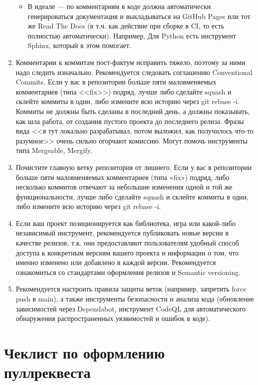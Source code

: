 \documentclass[a5paper]{article}
\begin{document}
\begin{enumerate}
\begin{itemize}
        \item В идеале --- по комментариям в коде должна автоматически генерироваться документация и выкладываться на GitHub Pages или тот же Read The Docs (в т.ч. как действие при сборке в CI, то есть полностью автоматически). Например, Для Python есть инструмент Sphinx, который в этом помогает.
    \end{itemize}
    \item Комментарии к коммитам пост-фактум исправить тяжело, поэтому за ними надо следить изначально. Рекомендуется следовать соглашению Conventional Commits. Если у вас в репозитории больше пяти маловменяемых комментариев (типа <<fix>>) подряд, лучше либо сделайте squash и склейте коммиты в один, либо измените всю историю через git rebase -i. Коммиты не должны быть сделаны в последний день, а должны показывать, как шла работа, от создания пустого проекта до последнего релиза. Фразы вида <<я тут локально разрабатывал, потом выложил, как получилось что-то разумное>> очень сильно огорчают комиссию. Могут помочь инструменты типа Mergeable, Mergify.
    \item Почистите главную ветку репозитория от лишнего. Если у вас в репозитории больше пяти маловменяемых комментариев (типа «fix») подряд, либо несколько коммитов отвечают за небольшие изменения одной и той же функциональности, лучше либо сделайте squash и склейте коммиты в один, либо измените всю историю через git rebase -i.
    \item Если ваш проект позиционируется как библиотека, игра или какой-либо независимый инструмент, рекомендуется публиковать новые версии в качестве релизов, т.к. они предоставляют пользователям удобный способ доступа к конкретным версиям вашего проекта и информации о том, что именно изменено или добавлено в каждой версии. Рекомендуется ознакомиться со стандартами оформления релизов и Semantic versioning.
    \item Рекомендуется настроить правила защиты веток (например, запретить force push в main), а также инструменты безопасности и анализа кода (обновление зависимостей через Dependabot, инструмент CodeQL для автоматического обнаружения распространенных уязвимостей и ошибок в коде).
\end{enumerate}

\section*{Чеклист по оформлению пуллреквеста}
\end{document}
